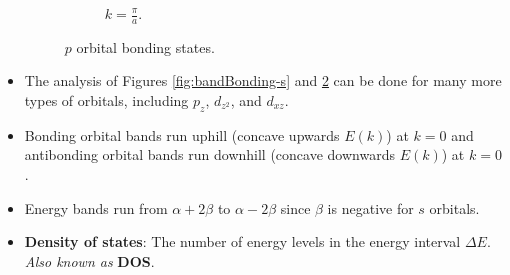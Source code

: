 \documentclass[../notes.tex]{subfiles}
\begin{document}
\begin{itemize}
\begin{figure}[h!]
\begin{subfigure}[b]{0.35\linewidth}
\begin{tikzpicture}
            \end{tikzpicture}
            \caption{$k=\frac{\pi}{a}$.}
            \label{fig:bandBonding-pb}
        \end{subfigure}
        \caption{$p$ orbital bonding states.}
        \label{fig:bandBonding-p}
    \end{figure}
    \item The analysis of Figures \ref{fig:bandBonding-s} and \ref{fig:bandBonding-p} can be done for many more types of orbitals, including $p_z$, $d_{z^2}$, and $d_{xz}$.
    \item Bonding orbital bands run uphill (concave upwards $E(k)$) at $k=0$ and antibonding orbital bands run downhill (concave downwards $E(k)$) at $k=0$.
    \item Energy bands run from $\alpha+2\beta$ to $\alpha-2\beta$ since $\beta$ is negative for $s$ orbitals.
    \item \textbf{Density of states}: The number of energy levels in the energy interval $\Delta E$. \emph{Also known as} \textbf{DOS}.
    \begin{figure}[h!]
        \centering
\end{figure}
\end{itemize}
\end{document}
